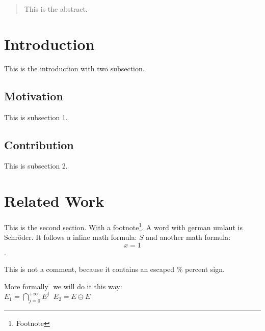 


\begin{abstract}
This is the abstract.
\end{abstract}

\section{Introduction}
This is the introduction with two subsection.

\subsection{Motivation}
This is subsection 1.

\subsection{Contribution}
This is subsection 2.

\section{Related Work}\label{xxx}
This is the second section. With a footnote\footnote{Footnote}.
A word with german umlaut is Schr\"{o}der. It follows a inline math formula: $S$
and another math formula: $$x=1$$.

This is not a comment, because it contains an escaped \% percent sign.

\begin{tabbing}
More formally \=\+ we will do it this way:\\
$E_1=\bigcap_{j=0}^{+\infty}E^j\;\;E_2=E\ominus E$\\
\end{tabbing}

